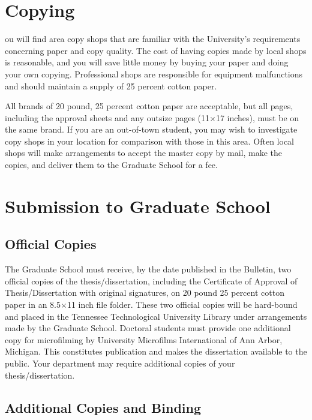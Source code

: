 \section{Copying}
\label{sec:Copying}

ou will find area copy shops that are familiar with the University's
requirements concerning paper and copy quality. The cost of having
copies made by local shops is reasonable, and you will save little
money by buying your paper and doing your own copying. Professional
shops are responsible for equipment malfunctions and should maintain a
supply of 25 percent cotton paper.

All brands of 20 pound, 25 percent cotton paper are acceptable, but
all pages, including the approval sheets and any outsize pages
(11$\times$17 inches), must be on the same brand. If you are an
out-of-town student, you may wish to investigate copy shops in your
location for comparison with those in this area. Often local shops
will make arrangements to accept the master copy by mail, make the
copies, and deliver them to the Graduate School for a fee.

\section{Submission to Graduate School}
\label{sec:SubmissionToGraduateSchool}

\subsection{Official Copies}
\label{sec:OfficialCopies}

The Graduate School must receive, by the date published in the
Bulletin, two official copies of the the\-sis/dis\-ser\-ta\-tion,
including the Certificate of Approval of The\-sis/Dis\-ser\-ta\-tion
with original signatures, on 20 pound 25 percent cotton paper in an
8.5$\times$11 inch file folder. These two official copies will be
hard-bound and placed in the Tennessee Technological University
Library under arrangements made by the Graduate School. Doctoral
students must provide one additional copy for microfilming by
University Microfilms International of Ann Arbor, Michigan. This
constitutes publication and makes the dissertation available to the
public. Your department may require additional copies of your
the\-sis/dis\-ser\-ta\-tion.

\subsection{Additional Copies and Binding}
\label{sec:AdditionalCopiesAndBinding}

